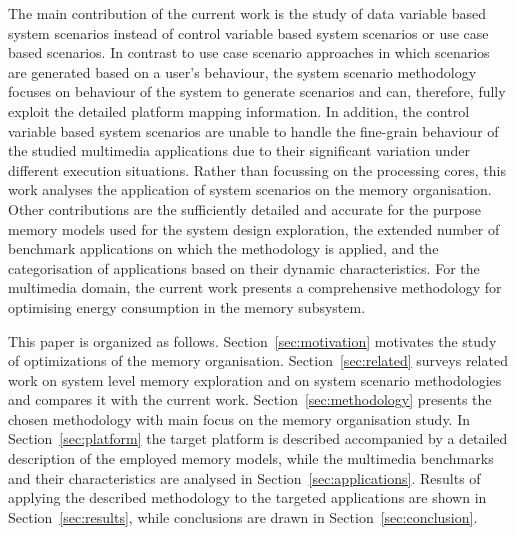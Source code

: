 \documentclass{acm_proc_article-sp}
\begin{document}
The main contribution of the current work is the study of data variable based system scenarios instead of control variable based system scenarios or use case based scenarios. In contrast to use case scenario approaches in which scenarios are generated based on a user's behaviour, the system scenario methodology focuses on behaviour of the system to generate scenarios and can, therefore, fully exploit the detailed platform mapping information. In addition, the control variable based system scenarios are unable to handle the fine-grain behaviour of the studied multimedia applications due to their significant variation under different execution situations. Rather than focussing on the processing cores, this work analyses the application of system scenarios on the memory organisation. Other contributions are the sufficiently detailed and accurate for the purpose memory models used for the system design exploration, the extended number of benchmark applications on which the methodology is applied, and the categorisation of applications based on their dynamic characteristics. For the multimedia domain, the current work presents a comprehensive methodology for optimising energy consumption in the memory subsystem.


This paper is organized as follows. Section~\ref{sec:motivation} motivates the study of optimizations of the memory organisation. Section~\ref{sec:related} surveys related work on system level memory exploration and on system scenario methodologies and compares it with the current work. Section~\ref{sec:methodology} presents the chosen methodology with main focus on the memory organisation study. In Section~\ref{sec:platform} the target platform is described accompanied by a detailed description of the employed memory models, while the multimedia benchmarks and their characteristics are analysed in Section~\ref{sec:applications}. Results of applying the described methodology to the targeted applications are shown in Section~\ref{sec:results}, while conclusions are drawn in Section~\ref{sec:conclusion}. 
\end{document}

